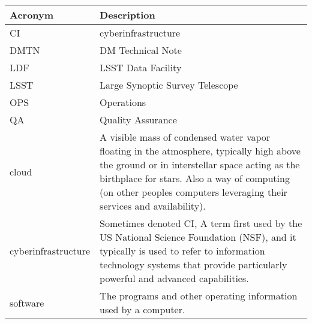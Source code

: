 \addtocounter{table}{-1}
\begin{longtable}{|l|p{}|}\hline
\textbf{Acronym} & \textbf{Description}  \\\hline

CI & \gls{cyberinfrastructure} \\\hline
DMTN & DM Technical Note \\\hline
LDF & LSST Data Facility \\\hline
LSST & Large Synoptic Survey Telescope \\\hline
OPS & Operations \\\hline
QA & Quality Assurance \\\hline
cloud & A visible mass of condensed water vapor floating in the atmosphere, typically high above the ground or in interstellar space acting as the birthplace for stars.  Also a way of computing (on other peoples computers leveraging their services and availability). \\\hline
cyberinfrastructure & Sometimes denoted CI, A term first used by the US National Science Foundation (\gls{NSF}), and it typically is used to refer to information technology systems that provide particularly powerful and advanced capabilities. \\\hline
software & The programs and other operating information used by a computer. \\\hline
\end{longtable}
